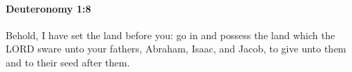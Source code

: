 
		\paragraph{Deuteronomy 1:8} %
			\label{DEUTERONOMY-1-8}

			Behold, I have set the land before you: go in and possess the land which the LORD sware unto your fathers, Abraham, Isaac, and Jacob, to give unto them and to their seed after them.


